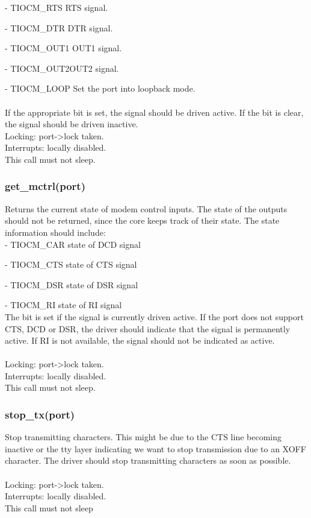 \documentclass[12pt,a4paper]{article}
\begin{document}
		- TIOCM\_RTS RTS signal.
		
		- TIOCM\_DTR	 DTR signal.
		
		- TIOCM\_OUT1 OUT1 signal.
		
		- TIOCM\_OUT2OUT2 signal.
		
		- TIOCM\_LOOP Set the port into loopback mode.\\ \\
	If the appropriate bit is set, the signal should be driven
	active.  If the bit is clear, the signal should be driven
	inactive.\\ 
	Locking: port-\textgreater lock taken.\\
	Interrupts: locally disabled.\\
	This call must not sleep.\\
	
\subsubsection{get\_mctrl(port)}
	Returns the current state of modem control inputs.  The state
	of the outputs should not be returned, since the core keeps
	track of their state.  The state information should include:\\
		- TIOCM\_CAR	 state of DCD signal
		
		- TIOCM\_CTS	 state of CTS signal
		
		- TIOCM\_DSR	 state of DSR signal
		
		- TIOCM\_RI	 state of RI signal\\
	The bit is set if the signal is currently driven active.  If
	the port does not support CTS, DCD or DSR, the driver should
	indicate that the signal is permanently active.  If RI is
	not available, the signal should not be indicated as active.\\ \\
	Locking: port-\textgreater lock taken.\\
	Interrupts: locally disabled.\\
	This call must not sleep.\\
\subsubsection{stop\_tx(port)} 
	Stop transmitting characters. This might be due to the CTS
	line becoming inactive or the tty layer indicating we want
	to stop transmission due to an XOFF character.
	The driver should stop transmitting characters as soon as
	possible.\\ \\
	Locking: port-\textgreater lock taken.\\
	Interrupts: locally disabled.\\
	This call must not sleep\\
\end{document}
